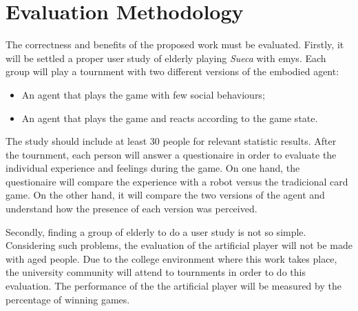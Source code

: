 \section{Evaluation Methodology} \label{sec:evaluation}

The correctness and benefits of the proposed work must be evaluated.
Firstly, it will be settled a proper user study of elderly playing \emph{Sueca} with \gls{emys}.
Each group will play a tournment with two different versions of the embodied agent:
\begin{itemize}
\item An agent that plays the game with few social behaviours;
\item An agent that plays the game and reacts according to the game state.
\end{itemize}
The study should include at least 30 people for relevant statistic results.
After the tournment, each person will answer a questionaire in order to evaluate the individual experience and feelings during the game.
On one hand, the questionaire will compare the experience with a robot versus the tradicional card game.
On the other hand, it will compare the two versions of the agent and understand how the presence of each version was perceived.

Secondly, finding a group of elderly to do a user study is not so simple.
Considering such problems, the evaluation of the artificial player will not be made with aged people.
Due to the college environment where this work takes place, the university community will attend to tournments in order to do this evaluation.
The performance of the the artificial player will be measured by the percentage of winning games.
